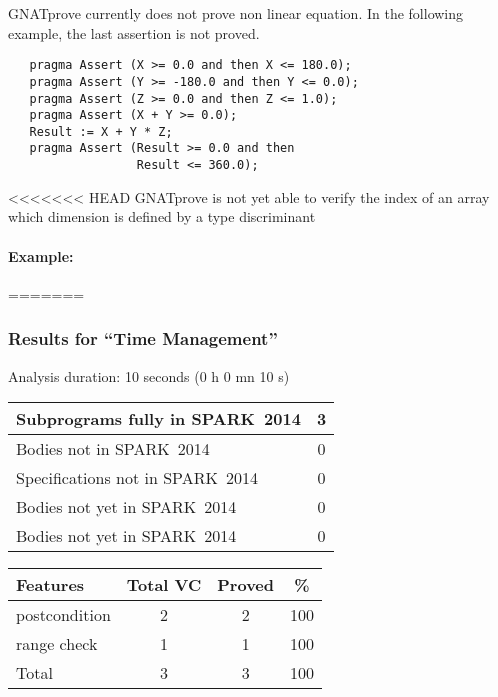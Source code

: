 \documentclass[10pt,a4paper,twocolumn]{article}
\newcommand{\gnatprove}{GNATprove\xspace}
\newcommand{\newspark}{SPARK~2014\xspace}
\begin{document}
\gnatprove currently does not prove non linear equation.
In the following example, the last assertion is not proved.

\begin{lstlisting}
   pragma Assert (X >= 0.0 and then X <= 180.0);
   pragma Assert (Y >= -180.0 and then Y <= 0.0);
   pragma Assert (Z >= 0.0 and then Z <= 1.0);
   pragma Assert (X + Y >= 0.0);
   Result := X + Y * Z;
   pragma Assert (Result >= 0.0 and then
                  Result <= 360.0);
\end{lstlisting}

<<<<<<< HEAD
\gnatprove is not yet able to verify the index of an array which
dimension is defined by a type discriminant

\paragraph{Example:}
=======
\subsubsection{Results for ``Time Management''}

Analysis duration: 10 seconds (0 h 0 mn 10 s)

\vspace{5mm}

\begin{tabular}{|l|c|}
\hline
Subprograms fully in \newspark  & 3 \\
\hline
Bodies not in \newspark         & 0 \\
\hline
Specifications not in \newspark & 0 \\
\hline
Bodies not yet in \newspark     & 0 \\
\hline
Bodies not yet in \newspark     & 0 \\
\hline
\end{tabular}

\vspace{5mm}

\begin{tabular}{|l|c|c|c|}
\hline
Features      & Total VC & Proved & \%  \\ %
\hline
postcondition & 2        & 2      & 100 \\ %
\hline
range check   & 1        & 1      & 100 \\ %
\hline
Total         & 3        & 3      & 100 \\ %
\hline
\end{tabular}
\end{document}
